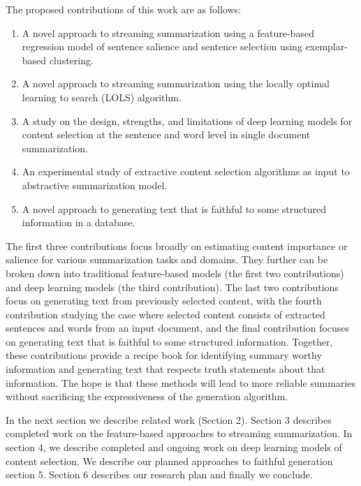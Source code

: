 The proposed contributions of this work are as follows:
\begin{enumerate}

 \item A novel approach to streaming summarization using a feature-based
     regression model of sentence salience and sentence selection using 
     exemplar-based clustering.

 \item A novel approach to streaming summarization using the locally optimal
     learning to search (LOLS) algorithm.

 \item A study on the design, strengths, and limitations of deep learning 
     models for content selection at the sentence and word level in 
     single document summarization. 

 \item An experimental study of extractive content selection algorithms
     as input to abstractive summarization model.

 \item A novel approach to generating text that is faithful to some
     structured information in a database.

\end{enumerate}

The first three contributions focus broadly on estimating content importance
or salience for various summarization tasks and domains. They further
can be broken down into traditional feature-based models (the first two 
contributions) and deep learning models (the third contribution).
The last two contributions focus on generating text from previously 
selected content, with the fourth contribution studying the case where
selected content consists of extracted sentences and words from an input
document, and the final contribution focuses on generating text that is 
faithful to some structured information. Together, these contributions
provide a recipe book for identifying summary worthy information and 
generating text that respects truth statements about that information.
The hope is that these methods will lead to more reliable summaries
without sacrificing the expressiveness of the generation algorithm. 

In the next section we describe related work (Section 2). Section 3 describes
completed work on the feature-based approaches to streaming summarization.
In section 4, we describe completed and ongoing work on deep learning models
of content selection. We describe our planned approaches to faithful 
generation section 5. Section 6 describes our research plan and finally we 
conclude.




